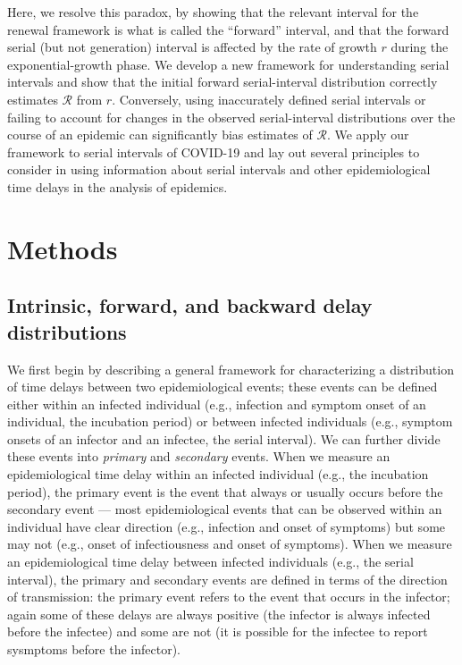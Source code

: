\documentclass[12pt]{article}
\newcommand{\RR}{\ensuremath{{\mathcal R}}\xspace}
\begin{document}
Here, we resolve this paradox, by showing that the relevant interval for the renewal framework is what is called the ``forward'' interval, and that the forward serial (but not generation) interval is affected by the rate of growth $r$ during the exponential-growth phase.
We develop a new framework for understanding serial intervals and show that the initial forward serial-interval distribution correctly estimates \RR from $r$.
Conversely, using inaccurately defined serial intervals or failing to account for changes in the observed serial-interval distributions over the course of an epidemic can significantly bias estimates of \RR.
We apply our framework to serial intervals of COVID-19 and lay out several principles to consider in using information about serial intervals and other epidemiological time delays in the analysis of epidemics.

\section{Methods}

\subsection{Intrinsic, forward, and backward delay distributions}

We first begin by describing a general framework for characterizing a distribution of time delays between two epidemiological events;
these events can be defined either within an infected individual (e.g., infection and symptom onset of an individual, the incubation period) or between infected individuals (e.g., symptom onsets of an infector and an infectee, the serial interval).
We can further divide these events into \emph{primary} and \emph{secondary} events.
When we measure an epidemiological time delay within an infected individual (e.g., the incubation period), the primary event is the event that always or usually occurs before the secondary event ---
most epidemiological events that can be observed within an individual have clear direction (e.g., infection and onset of symptoms) but some may not (e.g., onset of infectiousness and onset of symptoms).
When we measure an epidemiological time delay between infected individuals (e.g., the serial interval), 
the primary and secondary events are defined in terms of the direction of transmission:
the primary event refers to the event that occurs in the infector; again some of these delays are always positive (the infector is always infected before the infectee) and some are not (it is possible for the infectee to report sysmptoms before the infector). 
\end{document}
